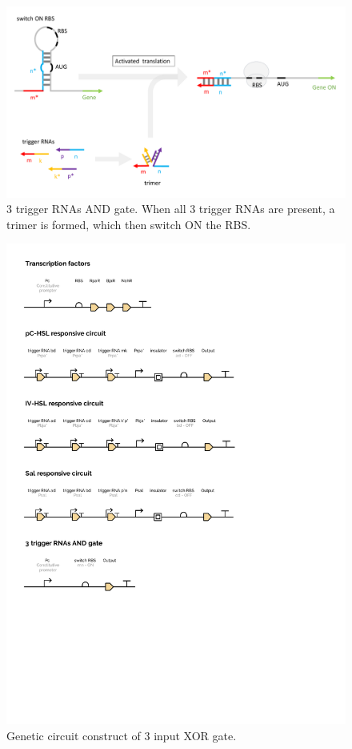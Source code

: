\documentclass[12pt,notitlepage]{article}
\begin{document}
\begin{figure}
    \centering
    \includegraphics[width=\textwidth]{images/xor_ribocomputing/3_trigger_rna_on.pdf}
    \caption{%
    3 trigger RNAs AND gate. When all 3 trigger RNAs are present, a trimer is formed, which then switch ON the RBS.}
    \label{f:3_RNA_on_rbs}
\end{figure}
    
\begin{figure}
    \centering
    \includegraphics{images/xor_ribocomputing/plot-3.pdf}
    \caption{Genetic circuit construct of 3 input XOR gate.}
    \label{f:p_construct_xor}
\end{figure}
\end{document}
